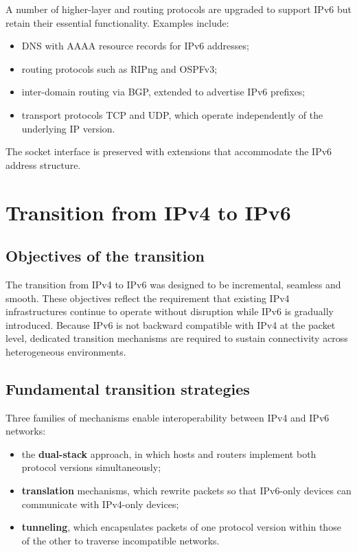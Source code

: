 \documentclass[11pt,a4paper,openany]{report}
\begin{document}
A number of higher-layer and routing protocols are upgraded to support IPv6 but retain their essential functionality. Examples include:

\begin{itemize}
\item DNS with AAAA resource records for IPv6 addresses;
\item routing protocols such as RIPng and OSPFv3;
\item inter-domain routing via BGP, extended to advertise IPv6 prefixes;
\item transport protocols TCP and UDP, which operate independently of the underlying IP version.
\end{itemize}

The socket interface is preserved with extensions that accommodate the IPv6 address structure.

\section{Transition from IPv4 to IPv6}

\subsection{Objectives of the transition}

The transition from IPv4 to IPv6 was designed to be incremental, seamless and smooth. These objectives reflect the requirement that existing IPv4 infrastructures continue to operate without disruption while IPv6 is gradually introduced. Because IPv6 is not backward compatible with IPv4 at the packet level, dedicated transition mechanisms are required to sustain connectivity across heterogeneous environments.

\subsection{Fundamental transition strategies}

Three families of mechanisms enable interoperability between IPv4 and IPv6 networks:

\begin{itemize}
\item the \textbf{dual-stack} approach, in which hosts and routers implement both protocol versions simultaneously;
\item \textbf{translation} mechanisms, which rewrite packets so that IPv6-only devices can communicate with IPv4-only devices;
\item \textbf{tunneling}, which encapsulates packets of one protocol version within those of the other to traverse incompatible networks.
\end{itemize}
\end{document}
